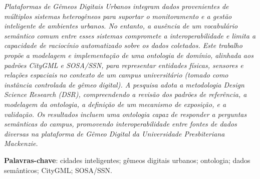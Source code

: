 \documentclass[
  article,   %
  11pt,      %
  oneside,   %
  a4paper,   %
  english,   %
  brazil,    %
  sumario=tradicional
]{abntex2}
\newcommand{\en}[1]{\foreignlanguage{english}{\textit{#1}}}
\begin{document}

\frenchspacing


%
%

\maketitle

\begin{resumoumacoluna}
  \textit{Plataformas de Gêmeos Digitais Urbanos integram dados provenientes de múltiplos sistemas heterogêneos para suportar o monitoramento e a gestão inteligente de ambientes urbanos.
    No entanto, a ausência de um vocabulário semântico comum entre esses sistemas compromete a
    interoperabilidade e limita a capacidade de raciocínio automatizado sobre os dados coletados.
    Este trabalho propõe a modelagem e implementação de uma ontologia de domínio, alinhada aos padrões
    CityGML e SOSA/SSN, para representar entidades físicas, sensores e relações espaciais no contexto
    de um campus universitário (tomado como instância controlada de gêmeo digital).
    A pesquisa adota a metodologia \en{Design Science Research} (DSR), compreendendo a revisão dos
    padrões de referência, a modelagem da ontologia, a definição de um mecanismo de exposição, e a
    validação.
    Os resultados incluem uma ontologia capaz de responder a perguntas semânticas
    do campus, promovendo interoperabilidade entre fontes de dados diversas na plataforma de Gêmeo Digital
    da Universidade Presbiteriana Mackenzie.
  }

  \vspace{\onelineskip}

  \noindent
  \textbf{Palavras-chave}: cidades inteligentes; gêmeos digitais urbanos; ontologia; dados semânticos; CityGML; SOSA/SSN.
\end{resumoumacoluna}
\end{document}
